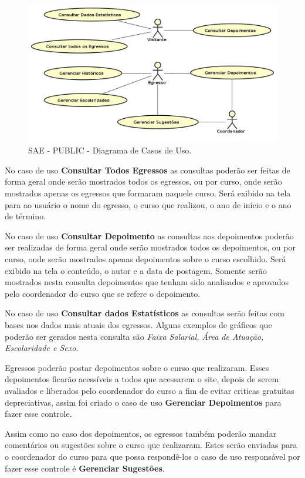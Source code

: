 \begin{figure}[!h]
	\centering
	\includegraphics[width=1\textwidth]{figuras/requisitos/casodeuso-public}
	\caption{SAE - PUBLIC - Diagrama de Casos de Uso.}
	\label{fig-requisitos-public-diagrama-casos-uso}
\end{figure}

No caso de uso \textbf{Consultar Todos Egressos} as consultas poderão ser feitas de forma geral onde serão mostrados todos os egressos, ou por curso, onde serão mostrados apenas os egressos que formaram naquele curso. Será exibido na tela para ao usuário o nome do egresso, o curso que realizou, o ano de início e o ano de término.

No caso de uso \textbf{Consultar Depoimento} as consultas aos depoimentos poderão ser realizadas de forma geral onde serão mostrados todos os depoimentos, ou por curso, onde serão mostrados apenas depoimentos sobre o curso escolhido. Será exibido na tela o conteúdo, o autor e a data de postagem. Somente serão mostrados nesta consulta depoimentos que tenham sido analisados e aprovados pelo coordenador do curso que se refere o depoimento.

No caso de uso \textbf{Consultar dados Estatísticos} as consultas serão feitas com bases nos dados mais atuais dos egressos. Alguns exemplos de gráficos que poderão ser gerados nesta consulta são \textit{Faixa Salarial, Área de Atuação, Escolaridade e Sexo}.
  	  
Egressos poderão postar depoimentos sobre o curso que realizaram. Esses depoimentos ficarão acessíveis a todos que acessarem o site, depois de serem avaliados e liberados pelo coordenador do curso a fim de evitar criticas gratuitas depreciativas, assim foi criado o caso de uso \textbf{Gerenciar Depoimentos} para fazer esse controle.  

Assim como no caso dos depoimentos, os egressos também poderão mandar comentários ou sugestões sobre o curso que realizaram. Estes serão enviadas para o coordenador do curso para que possa respondê-los o caso de uso responsável por fazer esse controle é \textbf{Gerenciar Sugestões}.


